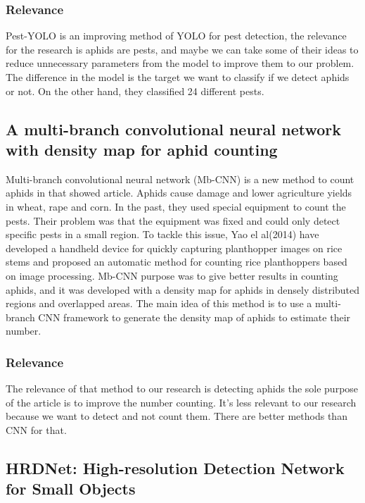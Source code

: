 \documentclass{article}
\begin{document}
\subsubsection*{Relevance}
Pest-YOLO is an improving method of YOLO for pest detection,
the relevance for the research is aphids are pests, and maybe we can take some of their ideas to reduce
unnecessary parameters from the model to improve them to our problem. The difference in the model is the target
we want to classify if we detect aphids or not. On the other hand, they classified 24 different pests.


\subsection*{A multi-branch convolutional neural network with density map for aphid counting \cite{MultiBranchCNN}}

Multi-branch convolutional neural network (Mb-CNN) is a new method to count aphids in that showed article. 
Aphids cause damage and lower agriculture yields in wheat, rape and corn. In the past, 
they used special equipment to count the pests. Their problem was that the equipment was fixed and could only 
detect specific pests in a small region. To tackle this issue, Yao el al(2014) have developed a 
handheld device for quickly capturing planthopper images on rice stems and proposed an automatic method for 
counting rice planthoppers based on image processing. Mb-CNN purpose was to give better results in counting 
aphids, and it was developed with a density map for aphids in densely distributed regions and overlapped areas. 
The main idea of this method is to use a multi-branch CNN framework to generate the 
density map of aphids to estimate their number.

\subsubsection*{Relevance}
The relevance of that method to our research is detecting aphids the sole purpose 
of the article is to improve the number counting. It's less relevant to our research 
because we want to detect and not count them. There are better methods than CNN for that.


\subsection*{HRDNet: High-resolution Detection Network for Small Objects \cite{HRDNet}}
\end{document}
